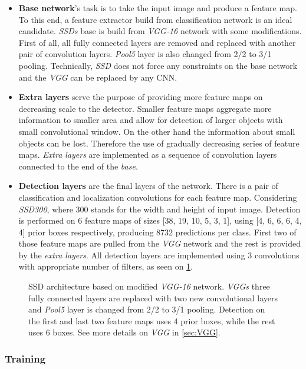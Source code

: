 \begin{itemize}
    \item \textbf{Base network}'s task is to take the input image and produce a feature map. To this end, a feature extractor build from classification network is an ideal candidate. \textit{SSDs} base is build from \textit{VGG-16} network with some modifications. First of all, all fully connected layers are removed and replaced with another pair of convolution layers. \textit{Pool5} layer is also changed from 2/2 to 3/1 pooling. Technically, \textit{SSD} does not force any constraints on the base network and the \textit{VGG} can be replaced by any CNN.
    \item \textbf{Extra layers} serve the purpose of providing more feature maps on decreasing scale to the detector. Smaller feature maps aggregate more information to smaller area and allow for detection of larger objects with small convolutional window. On the other hand the information about small objects can be lost. Therefore the use of gradually decreasing series of feature maps. \textit{Extra layers} are implemented as a sequence of convolution layers connected to the end of the \textit{base}.
    \item \textbf{Detection layers} are the final layers of the network. There is a pair of classification and localization convolutions for each feature map. Considering \textit{SSD300}, where 300 stands for the width and height of input image. Detection is performed on 6 feature maps of sizes [38, 19, 10, 5, 3, 1], using [4, 6, 6, 6, 4, 4] prior boxes respectively, producing 8732 predictions per class. First two of those feature maps are pulled from the \textit{VGG} network and the rest is provided by the \textit{extra layers}. All detection layers are implemented using 3 convolutions with appropriate number of filters, as seen on \cref{fig:VGGSSD}.
\end{itemize}

\begin{figure}
    \VGGSSD
    \caption{SSD architecture based on modified \textit{VGG-16} network. \textit{VGGs} three fully connected layers are replaced with two new convolutional layers and \textit{Pool5} layer is changed from 2/2 to 3/1 pooling. Detection on the first and last two feature maps uses 4 prior boxes, while the rest uses 6 boxes. See more details on \textit{VGG} in \cref{sec:VGG}.}
    \label{fig:VGGSSD}
\end{figure}


\subsubsection{Training}

